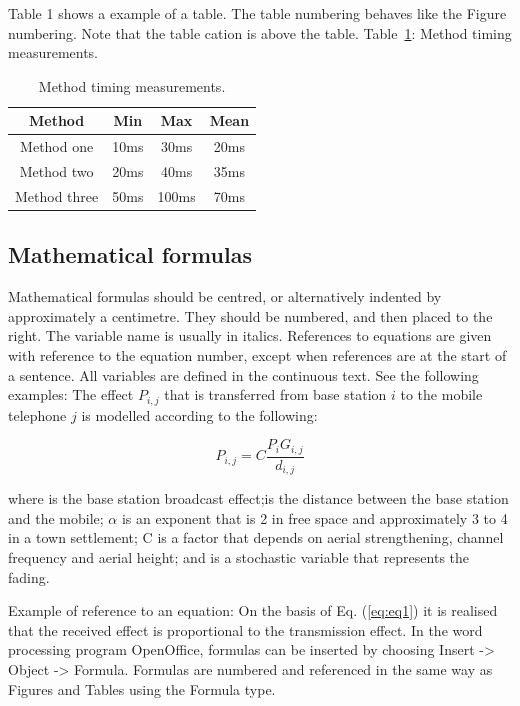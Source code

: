 Table 1 shows a example of a table. The table numbering behaves like the Figure
numbering. Note that the table cation is above the table. 
Table~\ref{table:methodmeasure}: Method timing measurements.

\begin{table}[h!]
\centering
\caption{Method timing measurements.}\label{table:methodmeasure}
\begin{tabular}{c c c c}
 \midrule
  Method & Min & Max & Mean \\ [0.5ex]
 \midrule
  Method one & 10ms & 30ms & 20ms \\
 \midrule
  Method two & 20ms & 40ms & 35ms \\
 \midrule
  Method three & 50ms & 100ms & 70ms \\
 \midrule
\end{tabular}
\end{table}


\subsection{Mathematical formulas}\label{subsec:mathematicalformulas}
Mathematical formulas should be centred, or alternatively indented by
approximately a centimetre. They should be numbered, and then placed to the
right. The variable name is usually in italics. References to equations are
given with reference to the equation number, except when references are at the
start of a sentence. All variables are defined in the continuous text. See the
following examples:
The effect \(P_{i,j}\) that is transferred from base station \(i\) to the mobile
telephone \(j\) is modelled according to the following:

\begin{equation}
P_{i,j}=C \frac{P_i G_{i,j}} {d_{i,j}}
\label{eq:eq1}
\end{equation}

where is the base station broadcast effect;is the distance between the base
station and the mobile;  $\alpha$ is an exponent that is 2 in free space and
approximately 3 to 4 in a town settlement; C is a factor that depends on aerial
strengthening, channel frequency and aerial height; and is a stochastic variable
that represents the fading.

Example of reference to an equation: On the basis of Eq. (\ref{eq:eq1}) it is
realised that the received effect is proportional to the transmission effect. In
the word processing program OpenOffice, formulas can be inserted by choosing
Insert -> Object -> Formula. Formulas are numbered and referenced in the same
way as Figures and Tables using the Formula type.
